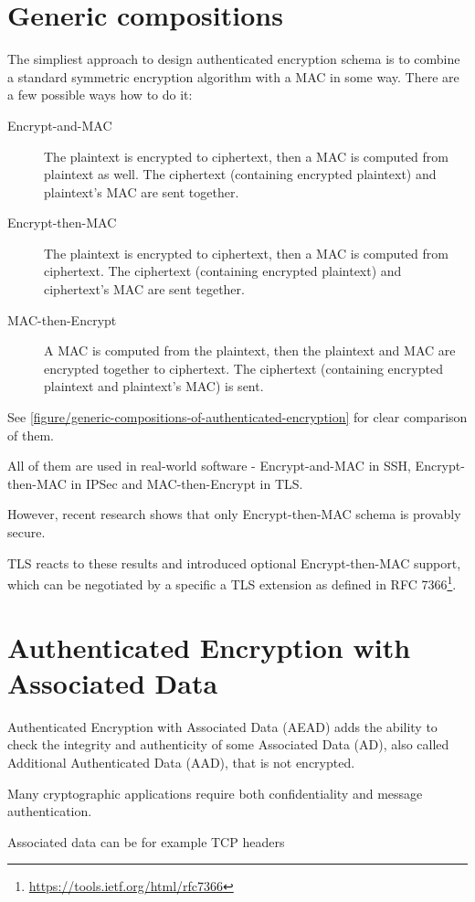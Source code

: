 \section{Generic compositions}

The simpliest approach to design authenticated encryption schema is to combine a standard symmetric encryption algorithm with a MAC in some way. There are a few possible ways how to do it:

\begin{description}
  \item[Encrypt-and-MAC] The plaintext is encrypted to ciphertext, then a MAC is computed from plaintext as well. The ciphertext (containing encrypted plaintext) and plaintext's MAC are sent together.
  \item[Encrypt-then-MAC] The plaintext is encrypted to ciphertext, then a MAC is computed from ciphertext. The ciphertext (containing encrypted plaintext) and ciphertext's MAC are sent tegether.
  \item[MAC-then-Encrypt] A MAC is computed from the plaintext, then the plaintext and MAC are encrypted together to ciphertext. The ciphertext (containing encrypted plaintext and plaintext's MAC) is sent.
\end{description}

See \autoref{figure/generic-compositions-of-authenticated-encryption} for clear comparison of them.

All of them are used in real-world software - Encrypt-and-MAC in SSH, Encrypt-then-MAC in IPSec and MAC-then-Encrypt in TLS.

However, recent research shows that only Encrypt-then-MAC schema is provably secure. \cite{generic-ae} \cite{generic-ae2}

TLS reacts to these results and introduced optional Encrypt-then-MAC support, which can be negotiated by a specific a TLS extension as defined in RFC 7366\footnote{\url{https://tools.ietf.org/html/rfc7366}}.



\section{Authenticated Encryption with Associated Data}

Authenticated Encryption with Associated Data (AEAD) adds the ability to check the integrity and authenticity of some Associated Data (AD), also called Additional Authenticated Data (AAD), that is not encrypted.

Many cryptographic applications require both confidentiality and message authentication.

Associated data can be for example TCP headers
